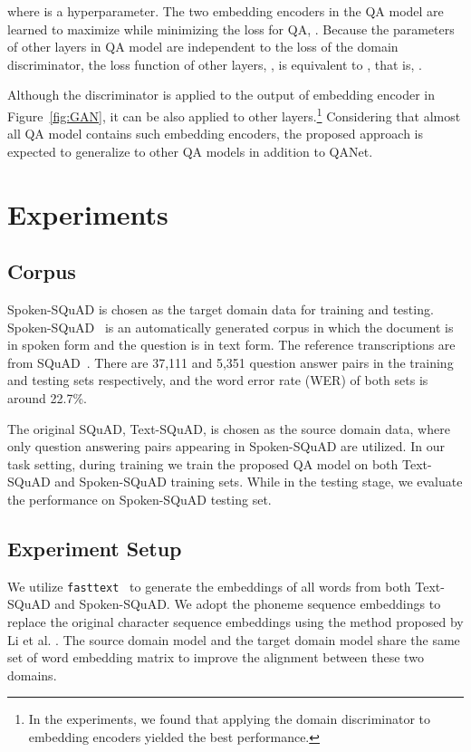 \documentclass{article}
\begin{document}
where  is a hyperparameter.
The two embedding encoders in the QA model are learned to maximize  while minimizing the loss for QA, .
Because the parameters of other layers in QA model are independent to the loss of the domain discriminator, the loss function of other layers, , is equivalent to  , that is, .  


Although the discriminator is applied to the output of embedding encoder in Figure~\ref{fig:GAN}, it can be also applied to other layers.\footnote{In the  experiments, we found that applying the domain discriminator to embedding encoders yielded the best performance.}
Considering that almost all QA model contains such embedding encoders, 
the proposed approach is expected to generalize to other QA models in addition to QANet.

\section{Experiments}

\subsection{Corpus}

Spoken-SQuAD is chosen as the target domain data for training and testing. Spoken-SQuAD~\cite{li2018spoken} is an automatically generated corpus in which the document is in spoken form and the question is in text form.
The reference transcriptions are from SQuAD~\cite{rajpurkar2016squad}.
There are 37,111 and 5,351 question answer pairs in the training and testing sets respectively, and the word error rate (WER) of both sets is around 22.7\%.

The original SQuAD, Text-SQuAD, is chosen as the source domain data, where only question answering pairs appearing in Spoken-SQuAD are utilized. 
In our task setting, during training we train the proposed QA model on both Text-SQuAD and Spoken-SQuAD training sets.
While in the testing stage, we evaluate the performance on Spoken-SQuAD testing set.

\subsection{Experiment Setup} 

We utilize \texttt{fasttext}~\cite{bojanowski2016enriching} to generate the embeddings of all words from both Text-SQuAD and Spoken-SQuAD. 
We adopt the phoneme sequence embeddings to replace the original character sequence embeddings using the method proposed by Li et al. \cite{li2018spoken}.
The source domain model and the target domain model share the same set of word embedding matrix to improve the alignment between these two domains.  
\end{document}
